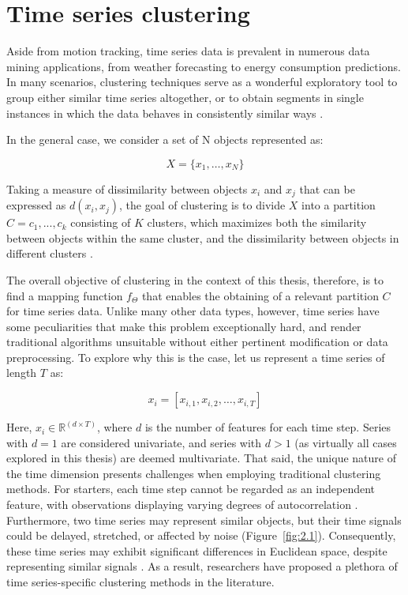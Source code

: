 \section{Time series clustering}

Aside from motion tracking, time series data is prevalent in numerous data mining applications, from weather forecasting to energy consumption predictions. In many scenarios, clustering techniques serve as a wonderful exploratory tool to group either similar time series altogether, or to obtain segments in single instances in which the data behaves in consistently similar ways \cite{ChristopherMBishop2006PatternLearning}.

In the general case, we consider a set of N objects represented as:

\begin{equation}
X = \{x_1, \ldots, x_N\}
\label{eq:2.1}
\end{equation}

Taking a measure of dissimilarity between objects $x_i$ and $x_j$ that can be expressed as $d(x_i, x_j)$, the goal of clustering is to divide $X$ into a partition $C = {c_1, ..., c_k}$ consisting of $K$ clusters, which maximizes both the similarity between objects within the same cluster, and the dissimilarity between objects in different clusters \cite{Lafabregue2022End-to-endStudy}. 

The overall objective of clustering in the context of this thesis, therefore, is to find a mapping function $f_\Theta$ that enables the obtaining of a relevant partition $C$ for time series data. Unlike many other data types, however, time series have some peculiarities that make this problem exceptionally hard, and render traditional algorithms unsuitable without either pertinent modification or data preprocessing. To explore why this is the case, let us represent a time series of length $T$ as:

\begin{equation}
x_i = [x_{i,1}, x_{i,2}, \ldots, x_{i,T}]
\label{eq:2.2}
\end{equation}

Here, $x_i \in \mathbb{R}^{(d \times T)}$, where $d$ is the number of features for each time step. Series with $d = 1$ are considered univariate, and series with $d > 1$ (as virtually all cases explored in this thesis) are deemed multivariate. That said, the unique nature of the time dimension presents challenges when employing traditional clustering methods. For starters, each time step cannot be regarded as an independent feature, with observations displaying varying degrees of autocorrelation \cite{Murphy2022ProbabilisticIntroduction}. Furthermore, two time series may represent similar objects, but their time signals could be delayed, stretched, or affected by noise (Figure~\ref{fig:2.1}). Consequently, these time series may exhibit significant differences in Euclidean space, despite representing similar signals \cite{Lafabregue2022End-to-endStudy}. As a result, researchers have proposed a plethora of time series-specific clustering methods in the literature.

